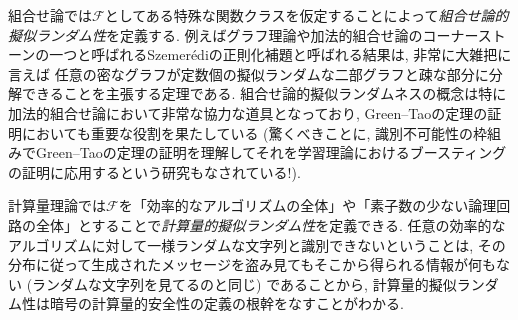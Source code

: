 組合せ論では$\mathcal{F}$としてある特殊な関数クラスを仮定することによって\emph{組合せ論的擬似ランダム性}を定義する.
例えばグラフ理論や加法的組合せ論のコーナーストーンの一つと呼ばれるSzemerédiの正則化補題と呼ばれる結果は, 非常に大雑把に言えば
任意の密なグラフが定数個の擬似ランダムな二部グラフと疎な部分に分解できることを主張する定理である.
組合せ論的擬似ランダムネスの概念は特に加法的組合せ論において非常な協力な道具となっており,
Green--Taoの定理の証明においても重要な役割を果たしている
(驚くべきことに, 識別不可能性の枠組みでGreen--Taoの定理の証明を理解してそれを学習理論におけるブースティングの証明に応用するという研究もなされている!).

計算量理論では$\mathcal{F}$を「効率的なアルゴリズムの全体」や「素子数の少ない論理回路の全体」とすることで\emph{計算量的擬似ランダム性}を定義できる.
任意の効率的なアルゴリズムに対して一様ランダムな文字列と識別できないということは, その分布に従って生成されたメッセージを盗み見てもそこから得られる情報が何もない (ランダムな文字列を見てるのと同じ) であることから, 計算量的擬似ランダム性は暗号の計算量的安全性の定義の根幹をなすことがわかる.

